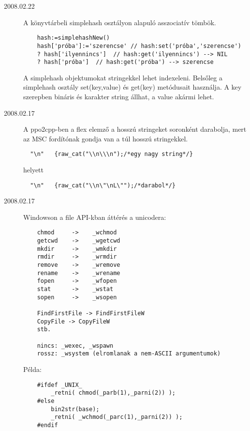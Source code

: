 \begin{description}
\label{20080222}
\item[2008.02.22]
  A könyvtárbeli simplehash osztályon alapuló asszociatív tömbök.
\begin{verbatim}
    hash:=simplehashNew()
    hash['próba']:='szerencse' // hash:set('próba','szerencse')
    ? hash['ilyennincs']  // hash:get('ilyennincs') --> NIL
    ? hash['próba']  // hash:get('próba') --> szerencse
\end{verbatim}
  A simplehash objektumokat stringekkel lehet indexeleni.
  Belsőleg a simplehash osztály set(key,value) és get(key) metódusait
  használja.  A key szerepben bináris és karakter string állhat, 
  a value akármi lehet. \par

\item[2008.02.17]
  A ppo2cpp-ben a flex elemző a hosszú stringeket soronként darabolja,
  mert az MSC fordítónak gondja van a túl hosszú stringekkel.

\begin{verbatim}
  "\n"   {raw_cat("\\n\\\n");/*egy nagy string*/}
\end{verbatim}
  
  helyett

\begin{verbatim}
  "\n"   {raw_cat("\\n\"\nL\"");/*darabol*/}
\end{verbatim}

\item[2008.02.17]
  Windowson a file API-kban áttérés a unicodera:
\begin{verbatim}
    chmod     ->    _wchmod  
    getcwd    ->    _wgetcwd 
    mkdir     ->    _wmkdir  
    rmdir     ->    _wrmdir  
    remove    ->    _wremove 
    rename    ->    _wrename 
    fopen     ->    _wfopen  
    stat      ->    _wstat   
    sopen     ->    _wsopen  

    FindFirstFile -> FindFirstFileW
    CopyFile -> CopyFileW
    stb.
      
    nincs: _wexec, _wspawn 
    rossz: _wsystem (elromlanak a nem-ASCII argumentumok)
\end{verbatim}
    
  Példa:

\begin{verbatim}
    #ifdef _UNIX_
        _retni( chmod(_parb(1),_parni(2)) );
    #else
        bin2str(base);
        _retni( _wchmod(_parc(1),_parni(2)) );
    #endif
\end{verbatim}


\end{description}
